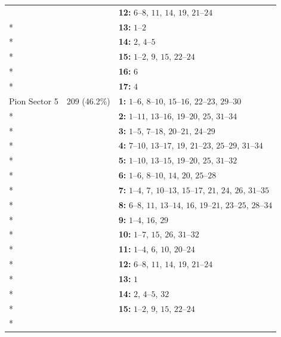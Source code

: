 \begin{longtable}{p{3.5cm}p{2.2cm}p{8.3cm}}
 &  & \textbf{12:} \mbox{$6$--$8$}, \mbox{$11$}, \mbox{$14$}, \mbox{$19$}, \mbox{$21$--$24$} \\*
 &  & \textbf{13:} \mbox{$1$--$2$} \\*
 &  & \textbf{14:} \mbox{$2$}, \mbox{$4$--$5$} \\*
 &  & \textbf{15:} \mbox{$1$--$2$}, \mbox{$9$}, \mbox{$15$}, \mbox{$22$--$24$} \\*
 &  & \textbf{16:} \mbox{$6$} \\*
 &  & \textbf{17:} \mbox{$4$} \\
\addlinespace
Pion Sector 5 & 209 (46.2\%) & \textbf{1:} \mbox{$1$--$6$}, \mbox{$8$--$10$}, \mbox{$15$--$16$}, \mbox{$22$--$23$}, \mbox{$29$--$30$} \\*
 &  & \textbf{2:} \mbox{$1$--$11$}, \mbox{$13$--$16$}, \mbox{$19$--$20$}, \mbox{$25$}, \mbox{$31$--$34$} \\*
 &  & \textbf{3:} \mbox{$1$--$5$}, \mbox{$7$--$18$}, \mbox{$20$--$21$}, \mbox{$24$--$29$} \\*
 &  & \textbf{4:} \mbox{$7$--$10$}, \mbox{$13$--$17$}, \mbox{$19$}, \mbox{$21$--$23$}, \mbox{$25$--$29$}, \mbox{$31$--$34$} \\*
 &  & \textbf{5:} \mbox{$1$--$10$}, \mbox{$13$--$15$}, \mbox{$19$--$20$}, \mbox{$25$}, \mbox{$31$--$32$} \\*
 &  & \textbf{6:} \mbox{$1$--$6$}, \mbox{$8$--$10$}, \mbox{$14$}, \mbox{$20$}, \mbox{$25$--$28$} \\*
 &  & \textbf{7:} \mbox{$1$--$4$}, \mbox{$7$}, \mbox{$10$--$13$}, \mbox{$15$--$17$}, \mbox{$21$}, \mbox{$24$}, \mbox{$26$}, \mbox{$31$--$35$} \\*
 &  & \textbf{8:} \mbox{$6$--$8$}, \mbox{$11$}, \mbox{$13$--$14$}, \mbox{$16$}, \mbox{$19$--$21$}, \mbox{$23$--$25$}, \mbox{$28$--$34$} \\*
 &  & \textbf{9:} \mbox{$1$--$4$}, \mbox{$16$}, \mbox{$29$} \\*
 &  & \textbf{10:} \mbox{$1$--$7$}, \mbox{$15$}, \mbox{$26$}, \mbox{$31$--$32$} \\*
 &  & \textbf{11:} \mbox{$1$--$4$}, \mbox{$6$}, \mbox{$10$}, \mbox{$20$--$24$} \\*
 &  & \textbf{12:} \mbox{$6$--$8$}, \mbox{$11$}, \mbox{$14$}, \mbox{$19$}, \mbox{$21$--$24$} \\*
 &  & \textbf{13:} \mbox{$1$} \\*
 &  & \textbf{14:} \mbox{$2$}, \mbox{$4$--$5$}, \mbox{$32$} \\*
 &  & \textbf{15:} \mbox{$1$--$2$}, \mbox{$9$}, \mbox{$15$}, \mbox{$22$--$24$} \\*

\end{longtable}
